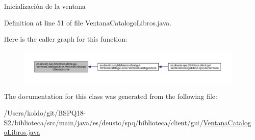 Inicialización de la ventana 

Definition at line 51 of file Ventana\+Catalogo\+Libros.\+java.

Here is the caller graph for this function\+:
\nopagebreak
\begin{figure}[H]
\begin{center}
\leavevmode
\includegraphics[width=350pt]{classes_1_1deusto_1_1spq_1_1biblioteca_1_1client_1_1gui_1_1_ventana_catalogo_libros_a269ed9764cf7fde7566c875b100ae4de_icgraph}
\end{center}
\end{figure}


The documentation for this class was generated from the following file\+:\begin{DoxyCompactItemize}
\item 
/\+Users/koldo/git/\+B\+S\+P\+Q18-\/\+S2/biblioteca/src/main/java/es/deusto/spq/biblioteca/client/gui/\mbox{\hyperlink{_ventana_catalogo_libros_8java}{Ventana\+Catalogo\+Libros.\+java}}\end{DoxyCompactItemize}
